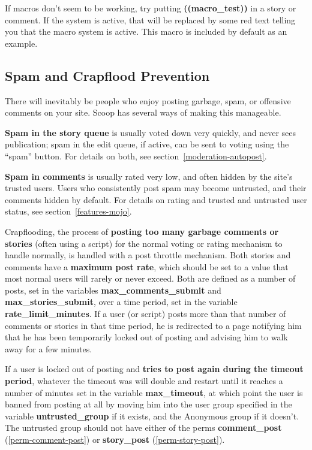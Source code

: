 If macros don't seem to be working, try putting {\bf ((macro\_test))} in a story or comment. If the system is active, that will be replaced by some red text telling you that the macro system is active. This macro is included by default as an example.

\subsection{Spam and Crapflood Prevention}
\label{features-anti-spam}

There will inevitably be people who enjoy posting garbage, spam, or offensive comments on your site.  Scoop has several ways of making this manageable.

{\bf Spam in the story queue} is usually voted down very quickly, and never sees publication; spam in the edit queue, if active, can be sent to voting using the ``spam'' button.  For details on both, see section~\ref{moderation-autopost}.

{\bf Spam in comments} is usually rated very low, and often hidden by the site's trusted users.  Users who consistently post spam may become untrusted, and their comments hidden by default.  For details on rating and trusted and untrusted user status, see section~\ref{features-mojo}.

Crapflooding, the process of {\bf posting too many garbage comments or stories} (often using a script) for the normal voting or rating mechanism to handle normally, is handled with a post throttle mechanism.  Both stories and comments have a {\bf maximum post rate}, which should be set to a value that most normal users will rarely or never exceed.  Both are defined as a number of posts, set in the variables {\bf max\_comments\_submit} and {\bf max\_stories\_submit}, over a time period, set in the variable {\bf rate\_limit\_minutes}.  If a user (or script) posts more than that number of comments or stories in that time period, he is redirected to a page notifying him that he has been temporarily locked out of posting and advising him to walk away for a few minutes.

If a user is locked out of posting and {\bf tries to post again during the timeout period}, whatever the timeout was will double and restart until it reaches a number of minutes set in the variable {\bf max\_timeout}, at which point the user is banned from posting at all by moving him into the user group specified in the variable {\bf untrusted\_group} if it exists, and the Anonymous group if it doesn't.  The untrusted group should not have either of the perms {\bf comment\_post} (\ref{perm-comment-post}) or {\bf story\_post} (\ref{perm-story-post}).

